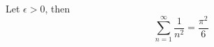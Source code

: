 Let $\epsilon > 0$, then 
\begin{equation}
	\sum_{n = 1}^\infty \frac{1}{n^2} = \frac{\pi^2}{6}
	\label{eq:check}
\end{equation}
